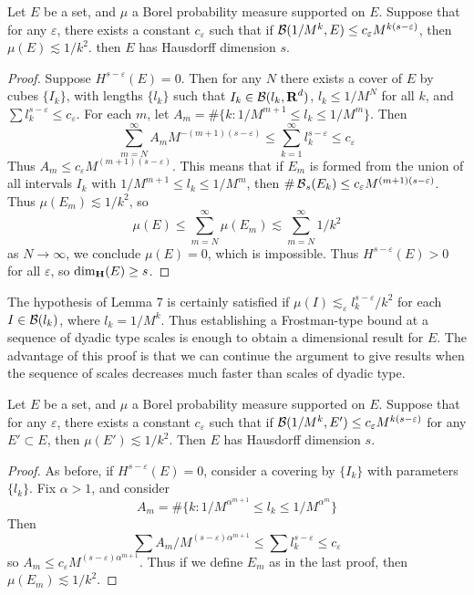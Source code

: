 \begin{lemma}
	Let $E$ be a set, and $\mu$ a Borel probability measure supported on $E$. Suppose that for any $\varepsilon$, there exists a constant $c_\varepsilon$ such that if $\operatorname{\mathcal{B}}(1/M^k,E) \leq c_\varepsilon M^{k(s-\varepsilon)}$, then $\mu(E) \lesssim 1/k^2$. then $E$ has Hausdorff dimension $s$.
\end{lemma}
\begin{proof}
	Suppose $H^{s-\varepsilon}(E) = 0$. Then for any $N$ there exists a cover of $E$ by cubes $\{ I_k \}$, with lengths $\{ l_k \}$ such that $I_k \in \operatorname{\mathcal{B}}(l_k,\operatorname{\mathbf{R}}^d)$, $l_k \leq 1/M^N$ for all $k$, and $\sum l_k^{s - \varepsilon} \leq c_\varepsilon$. For each $m$, let $A_m = \# \{ k : 1/M^{m+1} \leq l_k \leq 1/M^m \}$. Then
	\[ \sum_{m = N}^\infty A_m M^{-(m+1)(s - \varepsilon)} \leq \sum_{k = 1}^\infty l_k^{s - \varepsilon} \leq c_\varepsilon \]
	Thus $A_m \leq c_\varepsilon M^{(m+1)(s - \varepsilon)}$. This means that if $E_m$ is formed from the union of all intervals $I_k$ with $1/M^{m+1} \leq l_k \leq 1/M^m$, then $\# \operatorname{\mathcal{B}}_s(E_k) \leq c_\varepsilon M^{(m+1)(s-\varepsilon)}$. Thus $\mu(E_m) \lesssim 1/k^2$, so
	\[ \mu(E) \leq \sum_{m = N}^\infty \mu(E_m) \lesssim \sum_{m = N}^\infty 1/k^2 \]
	as $N \to \infty$, we conclude $\mu(E) = 0$, which is impossible. Thus $H^{s-\varepsilon}(E) > 0$ for all $\varepsilon$, so $\operatorname{\dim_{\mathbf{H}}}(E) \geq s$.
\end{proof}

The hypothesis of Lemma 7 is certainly satisfied if $\mu(I) \lesssim_\varepsilon l_k^{s - \varepsilon}/k^2$ for each $I \in \operatorname{\mathcal{B}}(l_k)$, where $l_k = 1/M^k$. Thus establishing a Frostman-type bound at a sequence of dyadic type scales is enough to obtain a dimensional result for $E$. The advantage of this proof is that we can continue the argument to give results when the sequence of scales decreases much faster than scales of dyadic type.

\begin{theorem}
	Let $E$ be a set, and $\mu$ a Borel probability measure supported on $E$. Suppose that for any $\varepsilon$, there exists a constant $c_\varepsilon$ such that if $\operatorname{\mathcal{B}}(1/M^k,E') \leq c_\varepsilon M^{k(s-\varepsilon)}$ for any $E' \subset E$, then $\mu(E') \lesssim 1/k^2$. Then $E$ has Hausdorff dimension $s$.
\end{theorem}
\begin{proof}
	As before, if $H^{s-\varepsilon}(E) = 0$, consider a covering by $\{ I_k \}$ with parameters $\{ l_k \}$. Fix $\alpha > 1$, and consider
	\[ A_m = \# \{ k : 1/M^{\alpha^{m + 1}} \leq l_k \leq 1/M^{\alpha^m} \} \]
	Then
	\[ \sum A_m/M^{(s - \varepsilon) \alpha^{m+1}} \leq \sum l_k^{s - \varepsilon} \leq c_\varepsilon \]
	so $A_m \leq c_\varepsilon M^{(s - \varepsilon) \alpha^{m+1}}$. Thus if we define $E_m$ as in the last proof, then $\mu(E_m) \lesssim 1/k^2$.
\end{proof}

